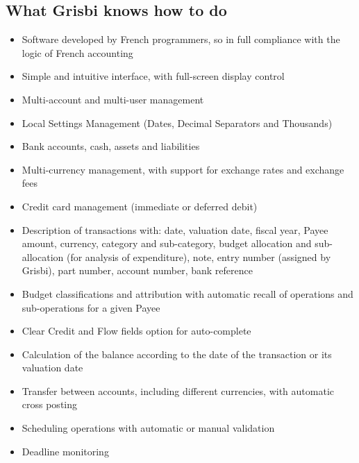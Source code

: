 \subsection{What Grisbi knows how to do}

\begin{itemize}

\item Software developed by French programmers, so in full compliance with the logic of French accounting

\item Simple and intuitive interface, with full-screen display control

\item Multi-account and multi-user management

\item Local Settings Management (Dates, Decimal Separators and Thousands)

\item Bank accounts, cash, assets and liabilities

\item Multi-currency management, with support for exchange rates and exchange fees

\item Credit card management (immediate or deferred debit)

\item Description of transactions with: date, valuation date, fiscal year, Payee amount, currency, category and sub-category, budget allocation and sub-allocation (for analysis of expenditure), note, entry number (assigned by Grisbi), part number, account number, bank reference

\item  Budget classifications and attribution with automatic recall of operations and sub-operations for a given Payee

\item Clear Credit and Flow fields option for auto-complete

\item Calculation of the balance according to the date of the transaction or its valuation date

\item Transfer between accounts, including different currencies, with automatic cross posting

\item Scheduling operations with automatic or manual validation

\item Deadline monitoring


\end{itemize}
